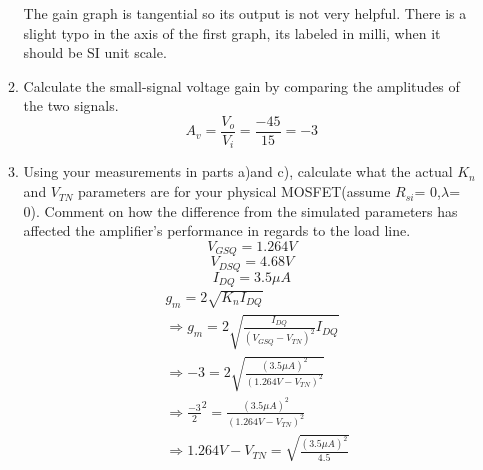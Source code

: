 \documentclass{article}
\begin{document}
\begin{enumerate}
\begin{enumerate}
\begin{center}
    \end{center}
    \begin{center}
        The gain graph is tangential so its output is not very helpful. There is a slight typo in the axis of the first graph, its labeled in milli, when it should be SI unit scale.
    \end{center}
    \item Calculate the small-signal voltage gain by comparing the amplitudes of the two signals.
    \begin{equation}
        A_v = \frac{V_o}{V_i} = \frac{-45}{15} =  -3
    \end{equation}
    \newpage
    \item Using your measurements in parts a)and c), calculate what the actual $K_n$ and $V_{TN}$ parameters are for your physical MOSFET(assume $R_{si}$= 0,$\lambda$= 0). Comment on how the difference from the simulated parameters has affected the amplifier’s performance in regards to the load line.
    \begin{equation}
        V_{GSQ} = 1.264V
    \end{equation}
    \begin{equation}
        V_{DSQ} = 4.68V
    \end{equation}
    \begin{equation}
        I_{DQ} = 3.5\mu A
    \end{equation}
        \begin{align}
        &g_m = 2\sqrt{K_nI_{DQ}}\\
        &\Rightarrow g_m = 2\sqrt{\frac{I_{DQ}}{(V_{GSQ}-V_{TN})^2}I_{DQ}}\\
        &\Rightarrow -3 = 2\sqrt{\frac{(3.5\mu A)^2}{(1.264V-V_{TN})^2}}\\
        &\Rightarrow \frac{-3}{2}^2 = \frac{(3.5\mu A)^2}{(1.264V-V_{TN})^2}\\
        &\Rightarrow 1.264V-V_{TN} = \sqrt{\frac{(3.5\mu A)^2}{4.5}}\\

\end{align}
\end{enumerate}
\end{enumerate}
\end{document}
